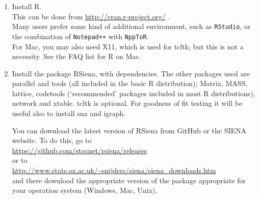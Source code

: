 \documentclass[a4paper,fleqn,11pt]{article}
\newcommand{\+}{\, + \,}
\newcommand{\sfn}[1]{\textsf{#1}}
\newcommand{\R}{{\sf R }}
\newcommand{\Rn}{{\sf R}}
\newcommand{\rs}{{\sf RSiena}}
\newcommand{\RS}{{\sf \textsf{RSiena} }}
\newcommand{\SI}{{\sf SIENA }}
\begin{document}
\begin{enumerate}
	\item	Install \Rn.\\
            This can be done from \url{http://cran.r-project.org/} .\\
            Many users prefer some kind of additional environment, such as \texttt{RStudio}, or
            the combination of \texttt{Notepad++} with \texttt{NppToR}.\\
            For Mac, you may also need \sfn{X11}, which is
            used for \sfn{tcltk}; but this is not a necessity. See the FAQ list for R on Mac.
	\item	Install the package \rs, with dependencies.
            The other packages used are  \sfn{parallel}
            and \sfn{tools} (all included in the basic \R distribution);
            \sfn{Matrix}, \sfn{MASS}, \sfn{lattice}, \sfn{codetools}
            (`recommended' packages included in most R distributions),
            \sfn{network} and \sfn{xtable}. \sfn{tcltk} is optional.
            For goodness of fit testing it will be useful also to
            install \sfn{sna} and \sfn{igraph}.

            You can download
            the latest version of \RS
            from GitHub or the \SI website.
            To do this, go to\\
            \url{https://github.com/stocnet/rsiena/releases}\\
            or to\\
              \url{http://www.stats.ox.ac.uk/~snijders/siena/siena_downloads.htm}\\
            and there download the appropriate version of the package
            appropriate for your operation system (Windows, Mac, Unix).

\end{enumerate}
\end{document}
